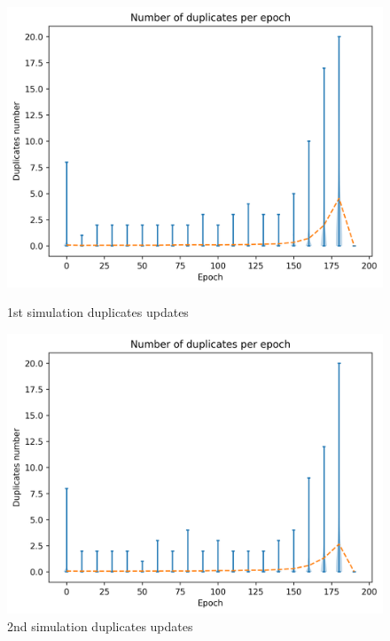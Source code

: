 \documentclass[mscthesis]{usiinfthesis}
\begin{document}
\begin{figure}[!htb]
   \begin{minipage}{0.49\textwidth}
     \centering
     \includegraphics[width=\linewidth]{images/1/1-duplicates.png}
  	\caption{1st simulation duplicates updates}
  	\label{fig:sim-one-duplicates}
   \end{minipage}\hfill
   \begin{minipage}{0.49\textwidth}
     \centering
     \includegraphics[width=\linewidth]{images/2/two-duplicates.png}
       \caption{2nd simulation duplicates updates}
 		\label{fig:sim-two-duplicates}
   \end{minipage}
\end{figure}
\end{document}
